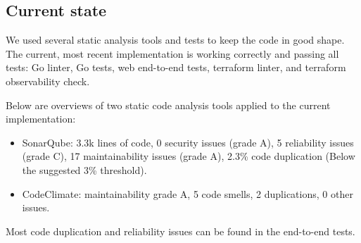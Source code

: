 

\subsection{Current state} %
We used several static analysis tools and tests to keep the
code in good shape. The current, most recent implementation
is working correctly and passing all tests: Go linter, Go 
tests, web end-to-end tests, terraform linter, and terraform 
observability check.

Below are overviews of two static code analysis tools applied to the 
current implementation:
\begin{itemize}
    \item SonarQube: 3.3k lines of code, 0 security issues (grade A), 5 reliability issues
    (grade C), 17 maintainability issues (grade A), 2.3\% code duplication
    (Below the suggested 3\% threshold).
    \item CodeClimate: maintainability grade A, 5 code smells, 2 duplications,
    0 other issues.
\end{itemize}

Most code duplication and reliability issues can be found in 
the end-to-end tests.


